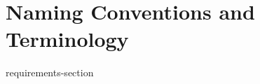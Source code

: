 \documentclass[journal,12pt,onecolumn,draftclsnofoot]{report}
\begin{document}
\section{Naming Conventions and Terminology}\label{sec:Naming}
 
\printnoidxglossaries

    
%    
%    
%    
%    
%    
%    
%    
%    
%    
%    

 {requirements-section}





\newpage




\newpage

\end{document}
